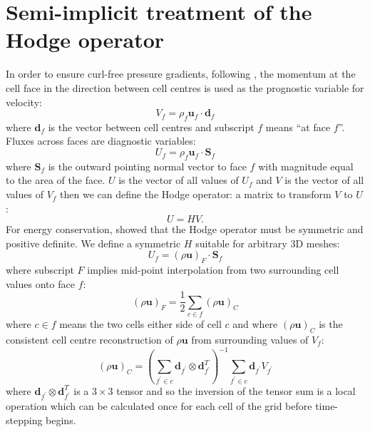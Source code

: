 \section{Semi-implicit treatment of the Hodge operator\label{appx:SI}}

In order to ensure curl-free pressure gradients, following \citet{WS14},
the momentum at the cell face in the direction between cell centres
is used as the prognostic variable for velocity:
\begin{equation}
V_{f}=\rho_{f}\mathbf{u}_{f}\cdot\mathbf{d}_{f}
\end{equation}
where $\mathbf{d}_{f}$ is the vector between cell centres and subscript
$f$ means ``at face $f$''. Fluxes across faces are diagnostic
variables:
\begin{equation}
U_{f}=\rho_{f}\mathbf{u}_{f}\cdot\mathbf{S}_{f}
\end{equation}
where $\mathbf{S}_{f}$ is the outward pointing normal vector to face
$f$ with magnitude equal to the area of the face. $U$ is the vector
of all values of $U_{f}$ and $V$ is the vector of all values of
$V_{f}$ then we can define the Hodge operator: a matrix to transform
$V$ to $U$:
\begin{equation}
U=HV.
\end{equation}
For energy conservation, \citet{TC12} showed that the Hodge operator
must be symmetric and positive definite. We define a symmetric $H$
suitable for arbitrary 3D meshes:
\begin{equation}
U_{f}=(\rho\mathbf{u})_{F}\cdot\mathbf{S}_{f}
\end{equation}
where subscript $F$ implies mid-point interpolation from two surrounding
cell values onto face $f$:
\begin{equation}
(\rho\mathbf{u})_{F}=\frac{1}{2}\sum_{c\in f}(\rho\mathbf{u})_{C}
\end{equation}
where $c\in f$ means the two cells either side of cell $c$ and where
$(\rho\mathbf{u})_{C}$ is the consistent cell centre reconstruction
of $\rho\mathbf{u}$ from surrounding values of $V_{f}$:
\[
(\rho\mathbf{u})_{C}=\left(\sum_{f^{\prime}\in c}\mathbf{d}_{f^{\prime}}\otimes\mathbf{d}_{f^{\prime}}^{T}\right)^{-1}\sum_{f^{\prime}\in c}\mathbf{d}_{f^{\prime}}V_{f^{\prime}}
\]
where $\mathbf{d}_{f^{\prime}}\otimes\mathbf{d}_{f^{\prime}}^{T}$
is a $3\times3$ tensor and so the inversion of the tensor sum is
a local operation which can be calculated once for each cell of the
grid before time-stepping begins. 

